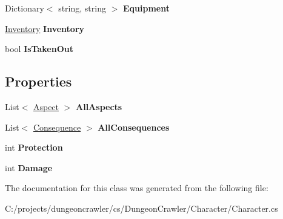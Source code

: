 \begin{DoxyCompactItemize}
\item 
\hypertarget{class_dungeon_crawler_1_1_character_1_1_character_a22cda9a13deb74dd0089970150354c9b}{}Dictionary$<$ string, string $>$ {\bfseries Equipment}\label{class_dungeon_crawler_1_1_character_1_1_character_a22cda9a13deb74dd0089970150354c9b}

\item 
\hypertarget{class_dungeon_crawler_1_1_character_1_1_character_a4a92503c577f806231fe03bafff227d2}{}\hyperlink{class_dungeon_crawler_1_1_character_1_1_inventory}{Inventory} {\bfseries Inventory}\label{class_dungeon_crawler_1_1_character_1_1_character_a4a92503c577f806231fe03bafff227d2}

\item 
\hypertarget{class_dungeon_crawler_1_1_character_1_1_character_aa9be269eb8ea184174ad9e27e06638e7}{}bool {\bfseries Is\+Taken\+Out}\label{class_dungeon_crawler_1_1_character_1_1_character_aa9be269eb8ea184174ad9e27e06638e7}

\end{DoxyCompactItemize}
\subsection*{Properties}
\begin{DoxyCompactItemize}
\item 
\hypertarget{class_dungeon_crawler_1_1_character_1_1_character_a970c74df860573bf88cfa26f6557142f}{}List$<$ \hyperlink{class_dungeon_crawler_1_1_core_1_1_aspect}{Aspect} $>$ {\bfseries All\+Aspects}\label{class_dungeon_crawler_1_1_character_1_1_character_a970c74df860573bf88cfa26f6557142f}

\item 
\hypertarget{class_dungeon_crawler_1_1_character_1_1_character_a4f17349415eb456f583217a8a53257fa}{}List$<$ \hyperlink{class_dungeon_crawler_1_1_character_1_1_consequence}{Consequence} $>$ {\bfseries All\+Consequences}\label{class_dungeon_crawler_1_1_character_1_1_character_a4f17349415eb456f583217a8a53257fa}

\item 
\hypertarget{class_dungeon_crawler_1_1_character_1_1_character_aea7275f0f81c59594d15852f3c1bc5ef}{}int {\bfseries Protection}\label{class_dungeon_crawler_1_1_character_1_1_character_aea7275f0f81c59594d15852f3c1bc5ef}

\item 
\hypertarget{class_dungeon_crawler_1_1_character_1_1_character_a3c018d2c63b73a6857252410772f65dd}{}int {\bfseries Damage}\label{class_dungeon_crawler_1_1_character_1_1_character_a3c018d2c63b73a6857252410772f65dd}

\end{DoxyCompactItemize}


The documentation for this class was generated from the following file\+:\begin{DoxyCompactItemize}
\item 
C\+:/projects/dungeoncrawler/cs/\+Dungeon\+Crawler/\+Character/Character.\+cs\end{DoxyCompactItemize}
